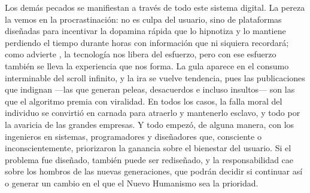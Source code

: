 Los demás pecados se manifiestan a través de todo este sistema digital. La pereza la vemos en la procrastinación: no es culpa del usuario, sino de plataformas diseñadas para incentivar la dopamina rápida que lo hipnotiza y lo mantiene perdiendo el tiempo durante horas con información que ni siquiera recordará; como advierte \textcite{borgmann1984}, la tecnología nos libera del esfuerzo, pero con ese esfuerzo también se lleva la experiencia que nos forma. La gula aparece en el consumo interminable del scroll infinito, y la ira se vuelve tendencia, pues las publicaciones que indignan —las que generan peleas, desacuerdos e incluso insultos— son las que el algoritmo premia con viralidad. En todos los casos, la falla moral del individuo se convirtió en carnada para atraerlo y mantenerlo esclavo, y todo por la avaricia de las grandes empresas. Y todo empezó, de alguna manera, con los ingenieros en sistemas, programadores y diseñadores que, consciente o inconscientemente, priorizaron la ganancia sobre el bienestar del usuario. Si el problema fue diseñado, también puede ser rediseñado, y la responsabilidad cae sobre los hombros de las nuevas generaciones, que podrán decidir si continuar así o generar un cambio en el que el Nuevo Humanismo sea la prioridad.









 